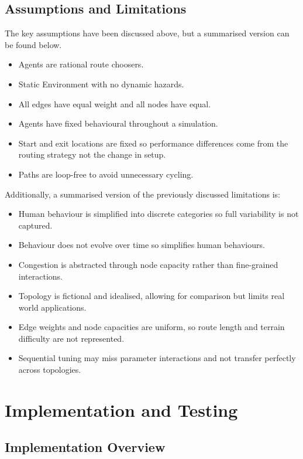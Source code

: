 \documentclass[12pt,a4paper]{report}
\begin{document}
\section{Assumptions and Limitations}
The key assumptions have been discussed above, but a summarised version can be found below.
\begin{itemize}
  \item Agents are rational route choosers.
  \item Static Environment with no dynamic hazards.
  \item All edges have equal weight and all nodes have equal.
  \item Agents have fixed behavioural throughout a simulation.
  \item Start and exit locations are fixed so performance differences come from the routing strategy not the change in setup.
  \item Paths are loop-free to avoid unnecessary cycling.
\end{itemize}

\vspace{1em}
Additionally, a summarised version of the previously discussed limitations is:
\begin{itemize}
  \item Human behaviour is simplified into discrete categories so full variability is not captured.
  \item Behaviour does not evolve over time so simplifies human behaviours.
  \item Congestion is abstracted through node capacity rather than fine-grained interactions.
  \item Topology is fictional and idealised, allowing for comparison but limits real world applications.
  \item Edge weights and node capacities are uniform, so route length and terrain difficulty are not represented.
  \item Sequential tuning may miss parameter interactions and not transfer perfectly across topologies.
\end{itemize}

\chapter{Implementation and Testing}
\section{Implementation Overview}
\end{document}
